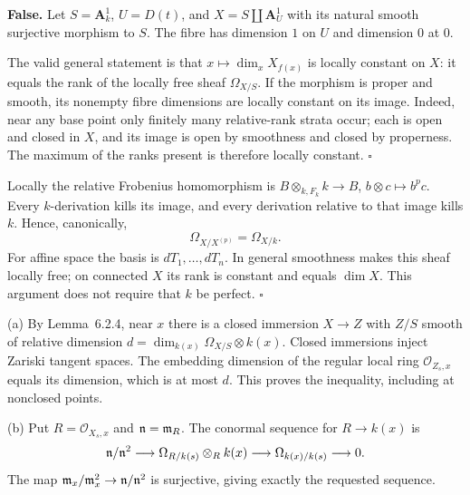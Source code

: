\documentclass[11pt]{article}
\let\chapterexercise\exercise
\renewcommand{\exercise}[2]{\Needspace{8\baselineskip}\chapterexercise{#1}{#2}}
\begin{document}
\pf
\textbf{False.} Let $S=\mathbf A^1_k$, $U=D(t)$, and $X=S\amalg\mathbf A^1_U$ with its natural smooth surjective morphism to $S$. The fibre has dimension $1$ on $U$ and dimension $0$ at $0$.

The valid general statement is that $x\mapsto\dim_xX_{f(x)}$ is locally constant on $X$: it equals the rank of the locally free sheaf $\Omega_{X/S}$. If the morphism is proper and smooth, its nonempty fibre dimensions are locally constant on its image. Indeed, near any base point only finitely many relative-rank strata occur; each is open and closed in $X$, and its image is open by smoothness and closed by properness. The maximum of the ranks present is therefore locally constant. \hfill$\square$

\pf
Locally the relative Frobenius homomorphism is $B\otimes_{k,F_k}k\to B$, $b\otimes c\mapsto b^pc$. Every $k$-derivation kills its image, and every derivation relative to that image kills $k$. Hence, canonically,
\[ \Omega_{X/X^{(p)}}=\Omega_{X/k}. \]
For affine space the basis is $dT_1,\ldots,dT_n$. In general smoothness makes this sheaf locally free; on connected $X$ its rank is constant and equals $\dim X$. This argument does not require that $k$ be perfect. \hfill$\square$

\pf
(a) By Lemma~6.2.4, near $x$ there is a closed immersion $X\to Z$ with $Z/S$ smooth of relative dimension $d=\dim_{k(x)}\Omega_{X/S}\otimes k(x)$. Closed immersions inject Zariski tangent spaces. The embedding dimension of the regular local ring $\mathcal O_{Z_s,x}$ equals its dimension, which is at most $d$. This proves the inequality, including at nonclosed points.

(b) Put $R=\mathcal O_{X_s,x}$ and $\mathfrak n=\mathfrak m_R$. The conormal sequence for $R\to k(x)$ is
\[ \mathfrak n/\mathfrak n^2\longrightarrow\Omega_{R/k(s)}\otimes_R k(x)\longrightarrow\Omega_{k(x)/k(s)}\longrightarrow0. \]
The map $\mathfrak m_x/\mathfrak m_x^2\to\mathfrak n/\mathfrak n^2$ is surjective, giving exactly the requested sequence.
\end{document}
